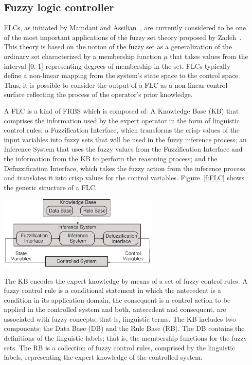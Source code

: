\documentclass[11pt,twoside]{article}
\begin{document}
\begin{multicols}{2}
\subsection{Fuzzy logic controller}
FLCs, as initiated by Mamdani and Assilian~\cite{Mamdani1974,MA1975}, are currently considered to be one of the most important applications of the fuzzy set theory proposed by Zadeh~\cite{Zadeh1965}. This theory is based on the notion of the fuzzy set as a generalization of the ordinary set characterized by a membership function $\mu$ that takes values from the interval [0, 1] representing degrees of membership in the set. FLCs typically define a non-linear mapping from the system's state space to the control space. Thus, it is possible to consider the output of a FLC as a non-linear control surface reflecting the process of the operator's prior knowledge.

A FLC is a kind of FRBS which is composed of: A Knowledge Base (KB) that comprises the information used by the expert operator in the form of linguistic control rules; a Fuzzification Interface, which transforms the crisp values of the input variables into fuzzy sets that will be used in the fuzzy inference process; an Inference System that uses the fuzzy values from the Fuzzification Interface and the information from the KB to perform the reasoning process; and the Defuzzification Interface, which takes the fuzzy action from the inference process and translates it into crisp values for the control variables. Figure~\ref{f:FLC} shows the generic structure of a FLC.

\vspace*{9pt}
\centerline{\includegraphics[width=3.15in]{./figs/FRBS-mam.eps}}
\vspace*{3pt}
\label{f:FLC}
\vspace*{5pt}

The KB encodes the expert knowledge by means of a set of fuzzy control rules. A fuzzy control rule is a conditional statement in which the antecedent is a condition in its application domain, the consequent is a control action to be applied in the controlled system and both, antecedent and consequent, are associated with fuzzy concepts; that is, linguistic terms. The KB includes two components: the Data Base (DB) and the Rule Base (RB). The DB contains the definitions of the linguistic labels; that is, the membership functions for the fuzzy sets. The RB is a collection of fuzzy control rules, comprised by the linguistic labels, representing the expert knowledge of the controlled system.


\end{multicols}
\end{document}
